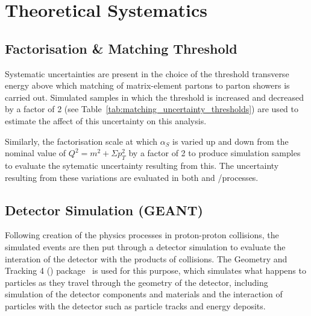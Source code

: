 
\section{Theoretical Systematics}
\label{s:Theoretical Systematics}
\subsection{Factorisation \& Matching Threshold}
\label{ss:factorisation_and_matching_threshold}
Systematic uncertainties are present in the choice of the threshold transverse energy above which matching of
matrix-element partons to parton showers is carried out. Simulated samples in which the threshold is
increased and decreased by a factor of 2 (see Table~\ref{tab:matching_uncertainty_thresholds}) are used to
estimate the affect of this uncertainty on this analysis.

Similarly, the factorisation scale at which $\alpha_{S}$ is varied up and down from the nominal value of
$Q^{2} = m^{2} + \Sigma p_{T}^{2}$ by a factor of 2 to produce simulation samples to evaluate the sytematic
uncertainty resulting from this. The uncertainty resulting from these variations are evaluated in both \ttbar
and \W/\ZpJets processes.



\subsection{Detector Simulation (GEANT)}
\label{ss:detector_simulation}
Following creation of the physics processes in proton-proton collisions, the simulated events are then put
through a detector simulation to evaluate the interation of the detector with the products of collisions. The
Geometry and Tracking 4 (\GEANTfour) package~\cite{Agostinelli:2002hh,Allison:2006ve} is used for this
purpose, which simulates what happens to particles as they travel through the geometry of the detector,
including simulation of the detector components and materials and the interaction of particles with the
detector such as particle tracks and energy deposits.
